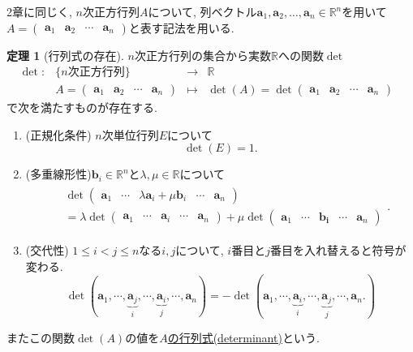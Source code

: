 \documentclass[dvipdfmx,a4paper,11pt]{article}
\newcommand{\R}{\mathbb{R}}
\theoremstyle{definition}
\newtheorem{thm}{定理}
\begin{document}
2章に同じく, $n$次正方行列$A$について, 列ベクトル$\bm{a}_1, \bm{a}_2, \ldots, \bm{a}_n \in \R^n$を用いて
    $A= \begin{pmatrix}
    \bm{a}_1&\bm{a}_2&\cdots&\bm{a}_n
    \end{pmatrix}$と表す記法を用いる. 
    
\begin{tcolorbox}[
    colback = white,
    colframe = green!35!black,
    fonttitle = \bfseries,
    breakable = true]
    \begin{thm}[行列式の存在]
    \label{thm-det}
    $n$次正方行列の集合から実数$\R$への関数$\det$
    $$
\begin{array}{ccccc}
\det: &\{\text{$n$次正方行列} \}& \rightarrow & \R& \\
&
A
=
    \begin{pmatrix}
    \bm{a}_1&\bm{a}_2&\cdots&\bm{a}_n
    \end{pmatrix}
 & 
 \longmapsto & 
 \det(A)=\det\begin{pmatrix}
    \bm{a}_1&\bm{a}_2&\cdots&\bm{a}_n
    \end{pmatrix}
 &
\end{array}
$$
で次を満たすものが存在する.
       \begin{enumerate}
    \setlength{\parskip}{0cm} 
  \setlength{\itemsep}{0cm}
\item (正規化条件) $n$次単位行列$E$について
$$\det(E)=1.$$
\item (多重線形性)$\bm{b}_{i} \in \R^n$と$\lambda, \mu \in \R$について
\begin{align*}
\begin{split}
&\det\begin{pmatrix}
    \bm{a}_1&\cdots&\lambda\bm{a}_i+\mu\bm{b}_i&\cdots&\bm{a}_n
    \end{pmatrix} \\
&=
\lambda \det\begin{pmatrix}
    \bm{a}_1&\cdots&\bm{a}_i&\cdots&\bm{a}_n
    \end{pmatrix}
+
\mu \det\begin{pmatrix}
    \bm{a}_1&\cdots&\bm{b_i}&\cdots&\bm{a}_n
    \end{pmatrix}
    \end{split}.
\end{align*}
\item (交代性) $1\le i< j \le n$なる$i,j$について, $i$番目と$j$番目を入れ替えると符号が変わる. 
$$
\det(
    \bm{a}_1, \cdots, \underbrace{\bm{a}_j}_{i}, \cdots , \underbrace{\bm{a}_i}_{j}, \cdots, \bm{a}_n
)
=
-\det(
    \bm{a}_1, \cdots, \underbrace{\bm{a}_i}_{i}, \cdots , \underbrace{\bm{a}_j}_{j}, \cdots, \bm{a}_n.
)
$$
  \end{enumerate}
  またこの関数$\det(A)$の値を\underline{$A$の行列式(determinant)}という. 
  

\end{thm}
\end{tcolorbox}
\end{document}
